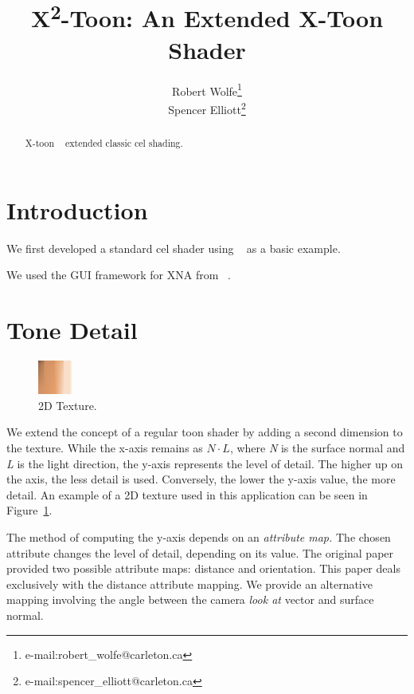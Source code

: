 \documentclass[annual]{acmsiggraph}
\title{X\textsuperscript{2}-Toon: An Extended X-Toon Shader}
\author{Robert Wolfe\thanks{e-mail:robert\_wolfe@carleton.ca}\\Spencer Elliott\thanks{e-mail:spencer\_elliott@carleton.ca}}
\begin{document}
\maketitle

\begin{abstract}

X-toon ~\cite{BTM06a} extended classic cel shading.

\end{abstract}

\keywordlist

\copyrightspace

\section{Introduction}

We first developed a standard cel shader using ~\cite{CelShadingTut} as a basic example.

We used the GUI framework for XNA from ~\cite{Ruminate}.

\section{Tone Detail}
\begin{figure}
  \vspace{-20pt}
  \begin{center}
    \includegraphics[width=0.1\textwidth]{images/xtoon_skin}
  \end{center}
  \caption{2D Texture.}
  \vspace{-10pt}
  \label{fig:2dtexture}
\end{figure}
We extend the concept of a regular toon shader by adding a second dimension to the texture. While the x-axis remains as $N\cdot L$, where {\it{N}} is the surface normal and {\it{L}} is the light direction, the y-axis represents the level of detail. The higher up on the axis, the less detail is used. Conversely, the lower the y-axis value, the more detail. An example of a 2D texture used in this application can be seen in Figure~\ref{fig:2dtexture}.

The method of computing the y-axis depends on an {\it{attribute map.}} The chosen attribute changes the level of detail, depending on its value. The original paper provided two possible attribute maps: distance and orientation. This paper deals exclusively with the distance attribute mapping. We provide an alternative mapping involving the angle between the camera {\it{look at}} vector and surface normal. 
\end{document}
